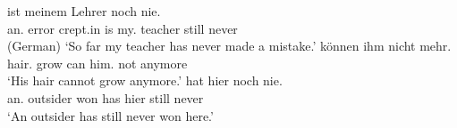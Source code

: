 \documentclass[output=paper,biblatex,babelshorthands,newtxmath,draftmode,colorlinks,citecolor=brown]{langscibook}
\begin{document}
\begin{exe}
\ex\label{ex:erg-subj-fronted}
  \begin{xlist}
  \ex\label{ex:erg-subj-fronted-indef} ist meinem Lehrer noch nie.\\
         {\LB}an.\nom{} error {crept.in} is my.\dat{} teacher still never\\\hfill(German)
         \trans `So far my teacher has never made a mistake.'
  \ex{} können ihm nicht mehr.\\
          {\LB}hair.\nom{} grow can him.\dat{} not anymore\\
          \trans `His hair cannot grow anymore.'
\ex\label{ex:nonerg-subj-fronted}
       hat hier noch nie.\\
           {\LB}an.\nom{} outsider won has hier still never\\
        \trans `An outsider has still never won here.' 
  \end{xlist}
\end{exe}
\end{document}
